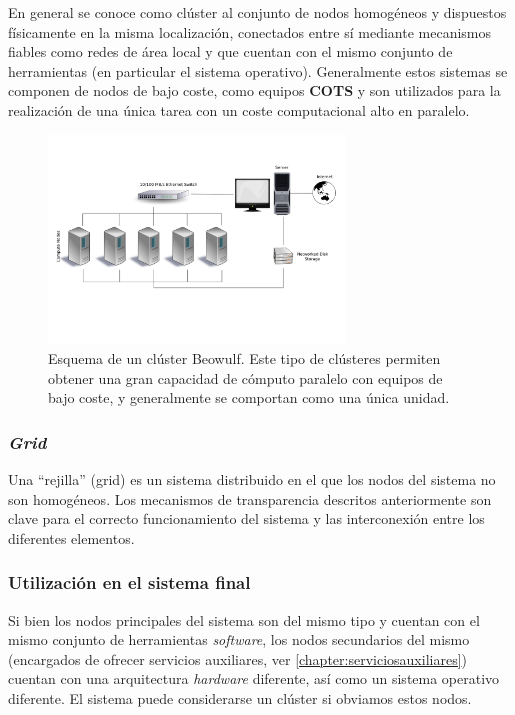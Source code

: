 En general se conoce como clúster al conjunto de nodos homogéneos y dispuestos físicamente en la misma localización, conectados entre sí mediante mecanismos fiables como redes de área local y que cuentan con el mismo conjunto de herramientas (en particular el sistema operativo). Generalmente estos sistemas se componen de nodos de bajo coste, como equipos \textbf{COTS} y son utilizados para la realización de una única tarea con un coste computacional alto en paralelo.


\begin{figure}[H]
  \centering
  \includegraphics[width=0.7\textwidth]{Chapter2/Figures/Beowulf.png}
  \caption[Beowulf]{Esquema de un clúster Beowulf. Este tipo de clústeres permiten obtener una gran capacidad de cómputo paralelo con equipos de bajo coste, y generalmente se comportan como una única unidad.}
\label{fig:beowulf}
\end{figure}

\subsubsection{\textit{Grid}}

Una ``rejilla'' (grid) es un sistema distribuido en el que los nodos del sistema no son homogéneos. Los mecanismos de transparencia descritos anteriormente son clave para el correcto funcionamiento del sistema y las interconexión entre los diferentes elementos.

\subsubsection{Utilización en el sistema final}

Si bien los nodos principales del sistema son del mismo tipo y cuentan con el mismo conjunto de herramientas \textit{software}, los nodos secundarios del mismo (encargados de ofrecer servicios auxiliares, ver \ref{chapter:serviciosauxiliares}) cuentan con una arquitectura \textit{hardware} diferente, así como un sistema operativo diferente. El sistema puede considerarse un clúster si obviamos estos nodos.

